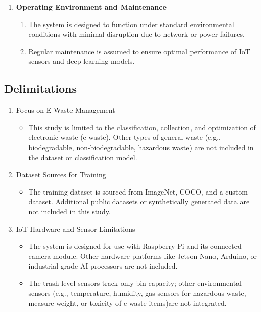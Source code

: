 \begin{enumerate}
    \item \textbf{Operating Environment and Maintenance}
    \begin{enumerate}
        \item The system is designed to function under standard environmental conditions with minimal disruption due to network or power failures.
        \item Regular maintenance is assumed to ensure optimal performance of IoT sensors and deep learning models.
    \end{enumerate}
\end{enumerate}

\subsection{Delimitations}
\begin{enumerate}
	\item Focus on E-Waste Management
		\begin{itemize}
			\item This study is limited to the classification, collection, and optimization of electronic waste (e-waste). Other types of general waste (e.g., biodegradable, non-biodegradable, hazardous waste) are not included in the dataset or classification model.
		\end{itemize}

	\item Dataset Sources for Training
		\begin{itemize}
			\item The training dataset is sourced from ImageNet, COCO, and a custom dataset. Additional public datasets or synthetically generated data are not included in this study.
		\end{itemize}

	\item IoT Hardware and Sensor Limitations
		\begin{itemize}
			\item The system is designed for use with Raspberry Pi and its connected camera module. Other hardware platforms like Jetson Nano, Arduino, or industrial-grade AI processors are not included.
			\item The trash level sensors track only bin capacity; other environmental sensors (e.g., temperature, humidity, gas sensors for hazardous waste, measure weight, or toxicity of e-waste items)are not integrated.
		\end{itemize}


\end{enumerate}
